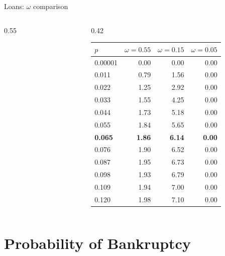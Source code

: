 \documentclass[aspectratio=169,10pt]{beamer}
\begin{document}
\begin{frame}{Loans: $\omega$ comparison}
\begin{columns}[T]
\begin{column}{0.55\textwidth}
\begin{figure}
      \end{figure}
    \end{column}
    \begin{column}{0.42\textwidth}
      \footnotesize\renewcommand{\arraystretch}{0.85}\setlength{\tabcolsep}{3pt}
      \begin{tabular}{lrrr}
        \toprule
        $p$ & $\omega=0.55$ & $\omega=0.15$ & $\omega=0.05$ \\
        \midrule
        0.00001 & 0.00 & 0.00 & 0.00 \\
        0.011 & 0.79 & 1.56 & 0.00 \\
        0.022 & 1.25 & 2.92 & 0.00 \\
        0.033 & 1.55 & 4.25 & 0.00 \\
        0.044 & 1.73 & 5.18 & 0.00 \\
        0.055 & 1.84 & 5.65 & 0.00 \\
        \textbf{0.065} & \textbf{1.86} & \textbf{6.14} & \textbf{0.00} \\
        0.076 & 1.90 & 6.52 & 0.00 \\
        0.087 & 1.95 & 6.73 & 0.00 \\
        0.098 & 1.93 & 6.79 & 0.00 \\
        0.109 & 1.94 & 7.00 & 0.00 \\
        0.120 & 1.98 & 7.10 & 0.00 \\
        \bottomrule
      \end{tabular}
    \end{column}
  \end{columns}
\end{frame}

\section{Probability of Bankruptcy}
\end{document}
